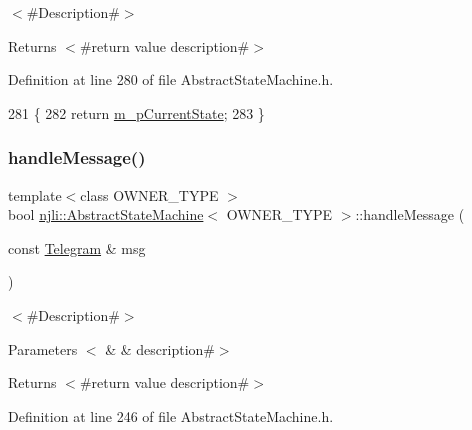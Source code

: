 $<$\#\+Description\#$>$

\begin{DoxyReturn}{Returns}
$<$\#return value description\#$>$ 
\end{DoxyReturn}


Definition at line 280 of file Abstract\+State\+Machine.\+h.


\begin{DoxyCode}
281   \{
282     \textcolor{keywordflow}{return} \mbox{\hyperlink{classnjli_1_1_abstract_state_machine_ae82332bd955b01fa48471ec0613e8207}{m\_pCurrentState}};
283   \}
\end{DoxyCode}
\mbox{\label{classnjli_1_1_abstract_state_machine_a7741c8bc8e0bf7d3d1b1e5310be6b5eb}} 
\subsubsection{\texorpdfstring{handle\+Message()}{handleMessage()}}
{\footnotesize\ttfamily template$<$class O\+W\+N\+E\+R\+\_\+\+T\+Y\+PE $>$ \\
bool \mbox{\hyperlink{classnjli_1_1_abstract_state_machine}{njli\+::\+Abstract\+State\+Machine}}$<$ O\+W\+N\+E\+R\+\_\+\+T\+Y\+PE $>$\+::handle\+Message (\begin{DoxyParamCaption}\item[{const \mbox{\hyperlink{classnjli_1_1_telegram}{Telegram}} \&}]{msg }\end{DoxyParamCaption})}

$<$\#\+Description\#$>$


\begin{DoxyParams}[1]{Parameters}
$<$ & {\em } & description\#$>$\\
\hline
\end{DoxyParams}
\begin{DoxyReturn}{Returns}
$<$\#return value description\#$>$ 
\end{DoxyReturn}


Definition at line 246 of file Abstract\+State\+Machine.\+h.


